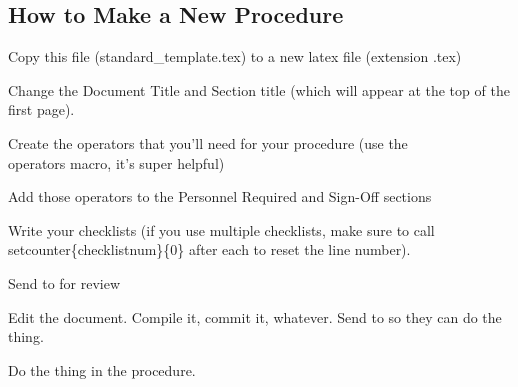 \newpage
\subsection{How to Make a New Procedure}
\begin{checklist}
    \item \auth{} Copy this file (standard\_template.tex) to a new latex file (extension .tex)
    \item \auth{} Change the Document Title and Section title (which will appear at the top of the first page).
    \item \auth{} Create the operators that you'll need for your procedure (use the \\operators macro, it's super helpful)
    \item \auth{} Add those operators to the Personnel Required and Sign-Off sections
    \item \auth{} Write your checklists (if you use multiple checklists, make sure to call \\setcounter\{checklistnum\}\{0\} after each to reset the line number).
    \item \auth{} Send to \edi{} for review
    \item \edi{} Edit the document. Compile it, commit it, whatever. Send to \perf{} so they can do the thing.
    \item \perf{} Do the thing in the procedure.
\end{checklist}
\setcounter{checklistnum}{0}


